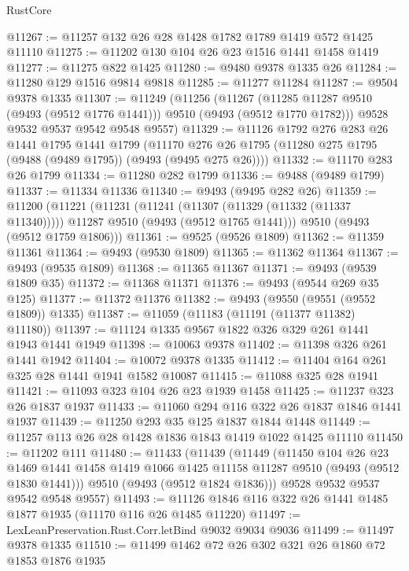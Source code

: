 \begin{lexlean}{RustCore}
\begin{coremodule}
@11267 := @11257 @132 @26 @28 @1428 @1782 @1789 @1419 @572 @1425 @11110
@11275 := @11202 @130 @104 @26 @23 @1516 @1441 @1458 @1419
@11277 := @11275 @822 @1425
@11280 := @9480 @9378 @1335 @26
@11284 := @11280 @129 @1516 @9814 @9818
@11285 := @11277 @11284
@11287 := @9504 @9378 @1335
@11307 := @11249
    (@11256
      (@11267 (@11285 @11287 @9510 (@9493 (@9512 @1776 @1441))) @9510 (@9493 (@9512 @1770 @1782)))
      @9528
      @9532
      @9537
      @9542
      @9548
      @9557)
@11329 := @11126
    @1792
    @276
    @283
    @26
    @1441
    @1795
    @1441
    @1799
    (@11170 @276 @26 @1795 (@11280 @275 @1795 (@9488 (@9489 @1795)) (@9493 (@9495 @275 @26))))
@11332 := @11170 @283 @26 @1799
@11334 := @11280 @282 @1799
@11336 := @9488 (@9489 @1799)
@11337 := @11334 @11336
@11340 := @9493 (@9495 @282 @26)
@11359 := @11200
    (@11221
      (@11231
        (@11241 (@11307 (@11329 (@11332 (@11337 @11340)))))
        @11287
        @9510
        (@9493 (@9512 @1765 @1441)))
      @9510
      (@9493 (@9512 @1759 @1806)))
@11361 := @9525 (@9526 @1809)
@11362 := @11359 @11361
@11364 := @9493 (@9530 @1809)
@11365 := @11362 @11364
@11367 := @9493 (@9535 @1809)
@11368 := @11365 @11367
@11371 := @9493 (@9539 @1809 @35)
@11372 := @11368 @11371
@11376 := @9493 (@9544 @269 @35 @125)
@11377 := @11372 @11376
@11382 := @9493 (@9550 (@9551 (@9552 @1809)) @1335)
@11387 := @11059 (@11183 (@11191 (@11377 @11382) @11180))
@11397 := @11124 @1335 @9567 @1822 @326 @329 @261 @1441 @1943 @1441 @1949
@11398 := @10063 @9378
@11402 := @11398 @326 @261 @1441 @1942
@11404 := @10072 @9378 @1335
@11412 := @11404 @164 @261 @325 @28 @1441 @1941 @1582 @10087
@11415 := @11088 @325 @28 @1941
@11421 := @11093 @323 @104 @26 @23 @1939 @1458
@11425 := @11237 @323 @26 @1837 @1937
@11433 := @11060 @294 @116 @322 @26 @1837 @1846 @1441 @1937
@11439 := @11250 @293 @35 @125 @1837 @1844 @1448
@11449 := @11257 @113 @26 @28 @1428 @1836 @1843 @1419 @1022 @1425 @11110
@11450 := @11202 @111
@11480 := @11433
    (@11439
      (@11449
        (@11450
          @104
          @26
          @23
          @1469
          @1441
          @1458
          @1419
          @1066
          @1425
          @11158
          @11287
          @9510
          (@9493 (@9512 @1830 @1441)))
        @9510
        (@9493 (@9512 @1824 @1836)))
      @9528
      @9532
      @9537
      @9542
      @9548
      @9557)
@11493 := @11126 @1846 @116 @322 @26 @1441 @1485 @1877 @1935 (@11170 @116 @26 @1485 @11220)
@11497 := LexLeanPreservation.Rust.Corr.letBind @9032 @9034 @9036
@11499 := @11497 @9378 @1335
@11510 := @11499 @1462 @72 @26 @302 @321 @26 @1860 @72 @1853 @1876 @1935

\end{coremodule}
\end{lexlean}
